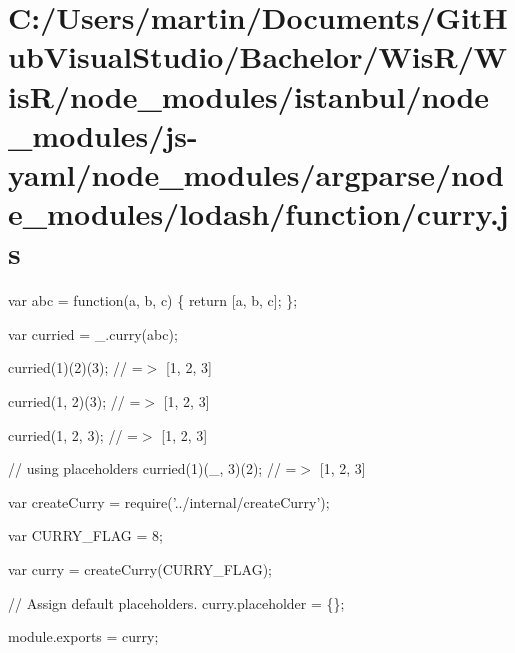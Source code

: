 \hypertarget{_c_1_2_users_2martin_2_documents_2_git_hub_visual_studio_2_bachelor_2_wis_r_2_wis_r_2node_modulef10b01c2c3a1b23766156fddf7b93eb3}{}\section{C\+:/\+Users/martin/\+Documents/\+Git\+Hub\+Visual\+Studio/\+Bachelor/\+Wis\+R/\+Wis\+R/node\+\_\+modules/istanbul/node\+\_\+modules/js-\/yaml/node\+\_\+modules/argparse/node\+\_\+modules/lodash/function/curry.\+js}
var abc = function(a, b, c) \{ return \mbox{[}a, b, c\mbox{]}; \};

var curried = \+\_\+.\+curry(abc);

curried(1)(2)(3); // =$>$ \mbox{[}1, 2, 3\mbox{]}

curried(1, 2)(3); // =$>$ \mbox{[}1, 2, 3\mbox{]}

curried(1, 2, 3); // =$>$ \mbox{[}1, 2, 3\mbox{]}

// using placeholders curried(1)(\+\_\+, 3)(2); // =$>$ \mbox{[}1, 2, 3\mbox{]}


\begin{DoxyCodeInclude}
var createCurry = require(\textcolor{stringliteral}{'../internal/createCurry'});

var CURRY\_FLAG = 8;

var curry = createCurry(CURRY\_FLAG);

\textcolor{comment}{// Assign default placeholders.}
curry.placeholder = \{\};

module.exports = curry;
\end{DoxyCodeInclude}
 